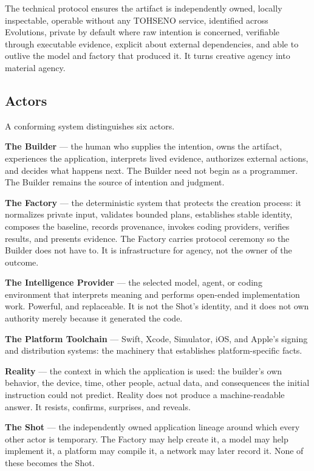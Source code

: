 \documentclass[11pt]{article}
\newcommand{\TOH}{TOHSENO}
\begin{document}
The technical protocol ensures the artifact is independently owned,
locally inspectable, operable without any \TOH{} service, identified
across Evolutions, private by default where raw intention is concerned,
verifiable through executable evidence, explicit about external
dependencies, and able to outlive the model and factory that produced
it. It turns creative agency into material agency.

\subsection{Actors}

A conforming system distinguishes six actors.

\textbf{The Builder} --- the human who supplies the intention, owns the
artifact, experiences the application, interprets lived evidence,
authorizes external actions, and decides what happens next. The Builder
need not begin as a programmer. The Builder remains the source of
intention and judgment.

\textbf{The Factory} --- the deterministic system that protects the
creation process: it normalizes private input, validates bounded plans,
establishes stable identity, composes the baseline, records provenance,
invokes coding providers, verifies results, and presents evidence. The
Factory carries protocol ceremony so the Builder does not have to. It is
infrastructure for agency, not the owner of the outcome.

\textbf{The Intelligence Provider} --- the selected model, agent, or
coding environment that interprets meaning and performs open-ended
implementation work. Powerful, and replaceable. It is not the Shot's
identity, and it does not own authority merely because it generated the
code.

\textbf{The Platform Toolchain} --- Swift, Xcode, Simulator, iOS, and
Apple's signing and distribution systems: the machinery that establishes
platform-specific facts.

\textbf{Reality} --- the context in which the application is used: the
builder's own behavior, the device, time, other people, actual data, and
consequences the initial instruction could not predict. Reality does not
produce a machine-readable answer. It resists, confirms, surprises, and
reveals.

\textbf{The Shot} --- the independently owned application lineage around
which every other actor is temporary. The Factory may help create it, a
model may help implement it, a platform may compile it, a network may
later record it. None of these becomes the Shot.
\end{document}
